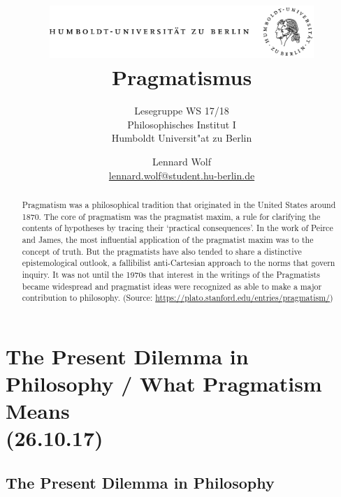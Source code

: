 \documentclass[emulatestandardclasses]{scrartcl}
\date{\vspace{-3ex}}
\begin{document}
\title{
	\includegraphics*[width=0.75\textwidth]{ErstesSem/images/hu_logo.png}\\
	\vspace{24pt}
	Pragmatismus}
\subtitle{\vspace{10pt}Lesegruppe WS 17/18\\
          Philosophisches Institut I \\ 
          Humboldt Universit"at zu Berlin}
\author{Lennard Wolf\\
        \small{\href{mailto:lennard.wolf@student.hu-berlin.de}{lennard.wolf@student.hu-berlin.de}}}
\maketitle
\begin{abstract}
Pragmatism was a philosophical tradition that originated in the United States around 1870. The core of pragmatism was the pragmatist maxim, a rule for clarifying the contents of hypotheses by tracing their ‘practical consequences’. In the work of Peirce and James, the most influential application of the pragmatist maxim was to the concept of truth. But the pragmatists have also tended to share a distinctive epistemological outlook, a fallibilist anti-Cartesian approach to the norms that govern inquiry. It was not until the 1970s that interest in the writings of the Pragmatists became widespread and pragmatist ideas were recognized as able to make a major contribution to philosophy. (Source: \url{https://plato.stanford.edu/entries/pragmatism/})

\end{abstract}
\newpage

\tableofcontents
\newpage


\section{The Present Dilemma in Philosophy / What Pragmatism Means\\(26.10.17)}

\subsection{The Present Dilemma in Philosophy}
\end{document}
